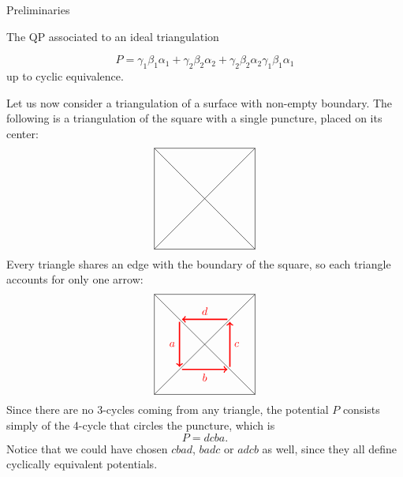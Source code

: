 \begin{chapter}{Preliminaries}
\begin{section}{The QP associated to an ideal triangulation}
\begin{exmp}
\[P = \gamma_1\beta_1\alpha_1+\gamma_2\beta_2\alpha_2+\gamma_2\beta_2\alpha_2\gamma_1\beta_1\alpha_1\]
up to cyclic equivalence.
\end{exmp}
\begin{exmp} Let us now consider a triangulation of a surface with non-empty boundary. The following is a triangulation of the square with a single puncture, placed on its center:
\[
\begin{tikzpicture}[scale=0.8]
\draw (-2,-2) to (-2,2);
\draw (-2,2) to (2,2);
\draw (2,2) to (2,-2);
\draw (2,-2) to (-2,-2);
\draw (-2,-2) to (2,2);
\draw (-2,2) to (2,-2);
\end{tikzpicture}
\]
Every triangle shares an edge with the boundary of the square, so each triangle accounts for only one arrow:
\[
\begin{tikzpicture}[scale=0.8]
\draw (-2,-2) to (-2,2);
\draw (-2,2) to (2,2);
\draw (2,2) to (2,-2);
\draw (2,-2) to (-2,-2);
\draw (-2,-2) to (2,2);
\draw (-2,2) to (2,-2);
\draw[->, red, very thick] (-1,0.9) to node[left] {$a$} (-1, -0.9);
\draw[->, red, very thick] (-0.9,-1) to node[below] {$b$} (0.9, -1);
\draw[->, red, very thick] (1,-0.9) to node[right] {$c$} (1, 0.9);
\draw[->, red, very thick] (0.9, 1) to node[above] {$d$} (-0.9, 1);
\end{tikzpicture}
\]
Since there are no 3-cycles coming from any triangle, the potential $P$ consists simply of the 4-cycle that circles the puncture, which is
\[P=dcba.\]
Notice that we could have chosen $cbad$, $badc$ or $adcb$ as well, since they all define cyclically equivalent potentials.
\end{exmp}
\end{section}
\end{chapter}
